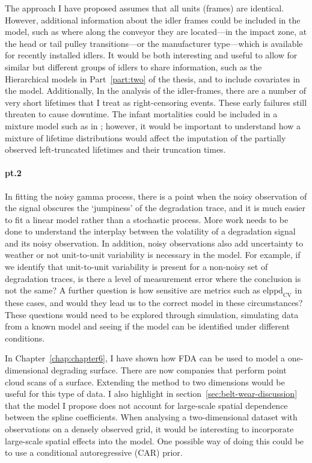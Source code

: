 The approach I have proposed assumes that all units (frames) are identical. However, additional information about the idler frames could be included in the model, such as where along the conveyor they are located---in the impact zone, at the head or tail pulley transitions---or the manufacturer type---which is available for recently installed idlers. It would be both interesting and useful to allow for similar but different groups of idlers to share information, such as the Hierarchical models in Part~\ref{part:two} of the thesis, and to include covariates in the model. Additionally, In the analysis of the idler-frames, there are a number of very short lifetimes that I treat as right-censoring events. These early failures still threaten to cause downtime. The infant mortalities could be included in a mixture model such as in \citet{mittman2013}; however, it would be important to understand how a mixture of lifetime distributions would affect the imputation of the partially observed left-truncated lifetimes and their truncation times.

\paragraph*{pt.2} In fitting the noisy gamma process, there is a point when the noisy observation of the signal obscures the `jumpiness' of the degradation trace, and it is much easier to fit a linear model rather than a stochastic process. More work needs to be done to understand the interplay between the volatility of a degradation signal and its noisy observation. In addition, noisy observations also add uncertainty to weather or not unit-to-unit variability is necessary in the model. For example, if we identify that unit-to-unit variability is present for a non-noisy set of degradation traces, is there a level of measurement error where the conclusion is not the same? A further question is how sensitive are metrics such as $\mbox{elppd}_{\text{CV}}$ in these cases, and would they lead us to the correct model in these circumstances? These questions would need to be explored through simulation, simulating data from a known model and seeing if the model can be identified under different conditions.

In Chapter~\ref{chap:chapter6}, I have shown how FDA can be used to model a one-dimensional degrading surface. There are now companies that perform point cloud scans of a surface. Extending the method to two dimensions would be useful for this type of data. I also highlight in section~\ref{sec:belt-wear-discussion} that the model I propose does not account for large-scale spatial dependence between the spline coefficients. When analysing a two-dimensional dataset with observations on a densely observed grid, it would be interesting to incorporate large-scale spatial effects into the model. One possible way of doing this could be to use a conditional autoregressive (CAR) prior.


